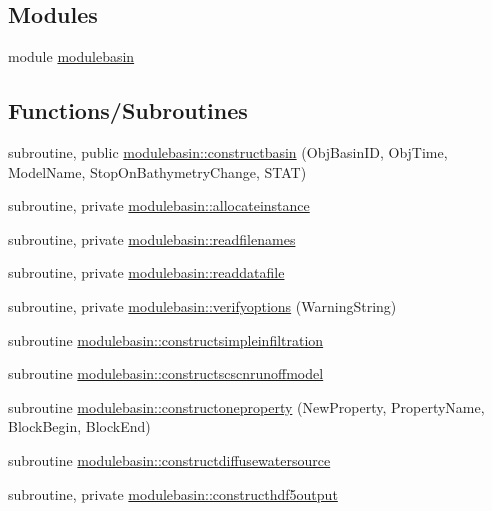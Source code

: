 \subsection*{Modules}
\begin{DoxyCompactItemize}
\item 
module \mbox{\hyperlink{namespacemodulebasin}{modulebasin}}
\end{DoxyCompactItemize}
\subsection*{Functions/\+Subroutines}
\begin{DoxyCompactItemize}
\item 
subroutine, public \mbox{\hyperlink{namespacemodulebasin_a51d97ade316802f4f499db0fb3835e3f}{modulebasin\+::constructbasin}} (Obj\+Basin\+ID, Obj\+Time, Model\+Name, Stop\+On\+Bathymetry\+Change, S\+T\+AT)
\item 
subroutine, private \mbox{\hyperlink{namespacemodulebasin_a59f6b3609f5cf292bc0d40591c8d6d33}{modulebasin\+::allocateinstance}}
\item 
subroutine, private \mbox{\hyperlink{namespacemodulebasin_a78bcec6c944663f5c555c4799011fd8f}{modulebasin\+::readfilenames}}
\item 
subroutine, private \mbox{\hyperlink{namespacemodulebasin_af9f507847046c6d52d84d57c39911669}{modulebasin\+::readdatafile}}
\item 
subroutine, private \mbox{\hyperlink{namespacemodulebasin_a6de1170114b38ad6db725fe89c8cd2bd}{modulebasin\+::verifyoptions}} (Warning\+String)
\item 
subroutine \mbox{\hyperlink{namespacemodulebasin_a0b7274cf3bbde399251125f839f59767}{modulebasin\+::constructsimpleinfiltration}}
\item 
subroutine \mbox{\hyperlink{namespacemodulebasin_a5a5342d9e5be44e9161d8d4643071661}{modulebasin\+::constructscscnrunoffmodel}}
\item 
subroutine \mbox{\hyperlink{namespacemodulebasin_a5a3aa456544a0c67f38a3d3655071347}{modulebasin\+::constructoneproperty}} (New\+Property, Property\+Name, Block\+Begin, Block\+End)
\item 
subroutine \mbox{\hyperlink{namespacemodulebasin_a3d6f3d514121b3b20c1b2d2ec4c56fa9}{modulebasin\+::constructdiffusewatersource}}
\item 
subroutine, private \mbox{\hyperlink{namespacemodulebasin_ad767dee07579ea3a5545d747a0d7cfcf}{modulebasin\+::constructhdf5output}}
\item 

\end{DoxyCompactItemize}
